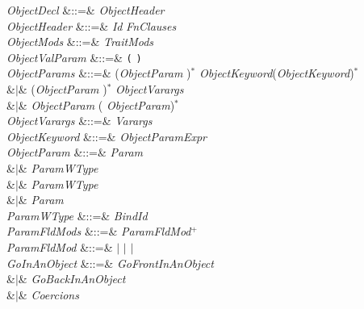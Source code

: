 \begin{Grammar}
\emph{ObjectDecl}  &::=& 
\emph{ObjectHeader}  
 \\

\emph{ObjectHeader} &::=&  \emph{Id}
 
 \emph{FnClauses} \\

\emph{ObjectMods} &::=& \emph{TraitMods}\\

\emph{ObjectValParam} &::=& \texttt(  \texttt) \\

\emph{ObjectParams}
&::=&
(\emph{ObjectParam} \EXP{,})$^*$ 
      \emph{ObjectKeyword}(\EXP{,}\emph{ObjectKeyword})$^*$\\
&$|$&
(\emph{ObjectParam} \EXP{,})$^*$ \emph{ObjectVarargs}\\
&$|$& \emph{ObjectParam} (\EXP{,} \emph{ObjectParam})$^*$\\

\emph{ObjectVarargs} &::=&  \emph{Varargs}\\

\emph{ObjectKeyword} &::=& \emph{ObjectParam}\EXP{=}\emph{Expr}\\

\emph{ObjectParam} &::=&
 \emph{Param} \\
&$|$&   \emph{ParamWType} \\
&$|$&   \emph{ParamWType} \\
&$|$&  \emph{Param} \\

\emph{ParamWType} &::=& \emph{BindId}  \\

\emph{ParamFldMods} &::=& \emph{ParamFldMod}$^+$\\

\emph{ParamFldMod} &::=& $|$  $|$  $|$ \\

\emph{GoInAnObject}
&::=& 
\emph{GoFrontInAnObject} \\
&$|$& 
\emph{GoBackInAnObject} \\
&$|$& \emph{Coercions}\\


\end{Grammar}

